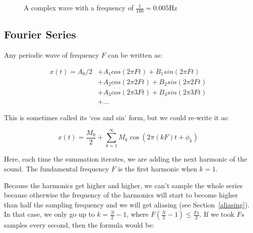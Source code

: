 \begin{figure}
  \centering
  \caption{A complex wave with a frequency of
  $\frac{1}{180} = 0.00\overline{5}\si{\hertz}$}
  \label{fig-complex-wave}
\end{figure} 

\subsection{Fourier Series}

Any periodic wave of frequency $F$ can be written as:

\begin{align*}
  x(t) = A_0 / 2 &+ A_1 cos(2 \pi Ft) + B_1 sin(2\pi Ft)\\
                 &+ A_2 cos(2 \pi 2Ft) + B_2 sin(2\pi 2Ft)\\
                 &+ A_3 cos(2 \pi 3Ft) + B_3 sin(2\pi 3Ft)\\
                 &+ \dots
\end{align*}

This is sometimes called its `cos and sin' form, but we could re-write it as:

\[
  x(t) = \frac{M_0}{2} + \sum\limits^\infty_{k=1}M_k\cos(2\pi (kF)t + \phi_k)
\]

Here, each time the summation iterates, we are adding the next harmonic of the
sound. The fundamental frequency $F$ is the first harmonic when $k=1$.

Because the harmonics get higher and higher, we can't sample the whole series
because otherwise the frequency of the harmonics will start to become higher
than half the sampling frequency and we will get aliasing (see
Section~\ref{aliasing}). In that case, we only go up to $k=\frac{N}{2} - 1$,
where $F(\frac{N}{2} - 1) \le \frac{Fs}{2}$. If we took $Fs$ samples every
second, then the formula would be:

